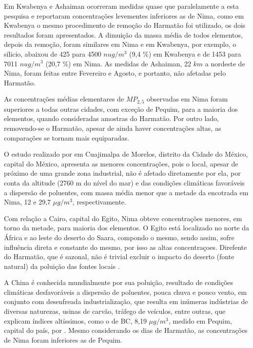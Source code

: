 Em Kwabenya e Ashaiman ocorreram medidas quase que paralelamente a esta 
pesquisa e reportaram concentrações levementes inferiores as de Nima, como
em Kwabenya o mesmo procedimento de remoção do Harmatão foi utilizado, os dois 
resultados foram apresentados. A dimuição da massa média de todos elementos,
depois da remoção, foram similares em Nima e em Kwabenya, 
por exemplo, o sílicio, abaixou de 425 para 4500 $nu g/m^3$ 
(9,4 \%) em Kwabenya e de 1453 para 7011 $nu g/m^3$ (20,7 \%) em Nima. 
As medidas de Ashaiman, 22 $km$ a nordeste de Nima, foram feitas entre 
Fevereiro e Agosto, e portanto, não afetadas pelo Harmatão. 

As concentrações médias elementares de $MP_{2,5}$ observadas em Nima foram 
superiores a todas outras cidades, com exceção de Pequim, 
para a maioria dos elementos, quando consideradas amostras do Harmatão.
Por outro lado, removendo-se o Harmatão, apesar de ainda haver concentrações
altas, as comparações se tornam mais equiparadas. 

O estudo realizado por \citet{diaz2014} em Cuajimalpa de Morelos, distrito 
da Cidade do México, capital do México, 
apresenta as menores concentrações, pois o local, apesar de próximo
de uma grande zona industrial, não é afetado diretamente por ela, por conta
da altitude (2760 m do nível do mar) e das condições climáticas favoráveis a
dispersão de poluentes, com massa média menor que a metade da encotrada em Nima, 
12 e 29,7 $\mu g/m^3$, respectivamente.

Com relação a Cairo, capital do Egito, Nima obteve concentrações menores, 
em torno da metade, para maioria dos elementos. O Egito está localizado 
no norte da África e ao leste do deserto do Saara, compondo o mesmo, sendo assim,
sofre influência direta e constante do mesmo, por isso as altas concentraçoes. 
Direfente do Harmatão, que é sazonal, não é trivial excluir o impacto 
do deserto (fonte natural) da poluição das fontes locais \citet{boman2013}.

A China é conhecida mundialmente por sua poluição, resultado de condições
climáticas desfavoráveis a dispersão de poluentes, pouca chuva e pouco vento, 
em conjunto com desenfreada industrialização, que resulta em inúmeras indústrias
de diversas naturezas, usinas de carvão, tráfego de veículos, entre outras, 
que explicam índices altíssimos, como o de BC, 8,19 $\mu g/m^3$, 
medido em Pequim, capital do país, por \citet{yang2011}. Mesmo considerando 
os dias de Harmatão, as concentrações de Nima foram inferiores as de Pequim.

